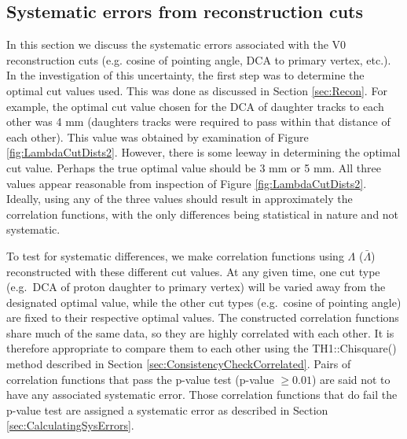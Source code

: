 


\subsection{Systematic errors from reconstruction cuts}
\label{sec:SystematicsReconstruction}

In this section we discuss the systematic errors associated with the V0 reconstruction cuts (e.g. cosine of pointing angle, DCA to primary vertex, etc.).  In the investigation of this uncertainty, the first step was to determine the optimal cut values used.  This was done as discussed in Section \ref{sec:Recon}.  For example, the optimal cut value chosen for the DCA of daughter tracks to each other was 4 mm (daughters tracks were required to pass within that distance of each other).  This value was obtained by examination of Figure \ref{fig:LambdaCutDists2}.  However, there is some leeway in determining the optimal cut value.  Perhaps the true optimal value should be 3 mm or 5 mm.  All three values appear reasonable from inspection of Figure \ref{fig:LambdaCutDists2}.  Ideally, using any of the three values should result in approximately the correlation functions, with the only differences being statistical in nature and not systematic.  

To test for systematic differences, we make correlation functions using $\Lambda$ ($\bar{\Lambda}$) reconstructed with these different cut values.  At any given time, one cut type (e.g.\ DCA of proton daughter to primary vertex) will be varied away from the designated optimal value, while the other cut types (e.g.\ cosine of pointing angle) are fixed to their respective optimal values. The constructed correlation functions share much of the same data, so they are highly correlated with each other.  It is therefore appropriate to compare them to each other using the TH1::Chisquare() method described in Section \ref{sec:ConsistencyCheckCorrelated}.  Pairs of correlation functions that pass the p-value test (p-value $\geq 0.01$) are said not to have any associated systematic error.  Those correlation functions that do fail the p-value test are assigned a systematic error as described in Section \ref{sec:CalculatingSysErrors}.



